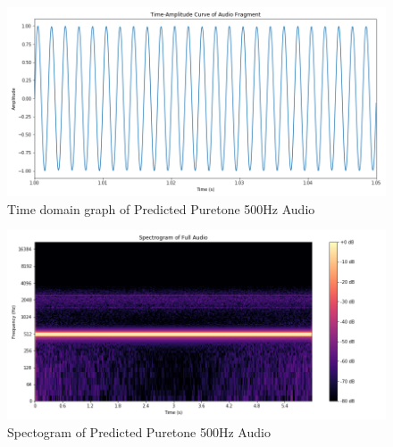 \documentclass{ioereport}
\begin{document}
    \begin{figure}[H]
        \centering
        \includegraphics[width=\linewidth]{assets/audio_results/predpuretone500hztime.png}
        \caption{Time domain graph of Predicted Puretone 500Hz Audio}
        \label{fig:pred-pure500-time}
    \end{figure}
    \begin{figure}[H]
        \centering
        \includegraphics[width=\linewidth]{assets/audio_results/predpuretone500hzspec.png}
        \caption{Spectogram of Predicted Puretone 500Hz Audio}
        \label{fig:pred-pure500-spec}
    \end{figure}
\end{document}
